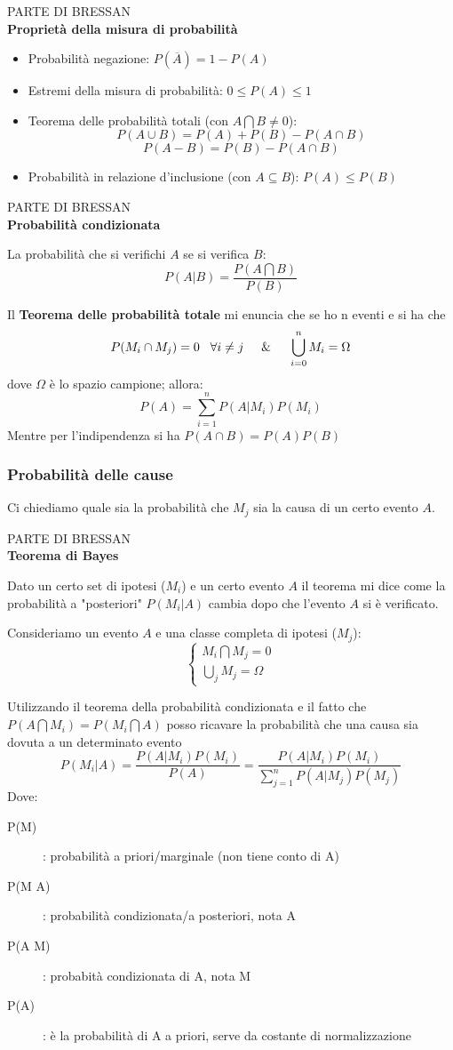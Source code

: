 \documentclass[openany,a4paper,12pt]{book}
\theoremstyle{remark}
\newcommand{\ripasso}[1]{
    \vspace{2em}\noindent %
    \begin{tcolorbox}[
        enhanced,
        boxrule=0pt,                  %
        frame hidden,                 %
        colback=red!5!white,          %
        borderline west={4pt}{0pt}{red!85!black}, %
        sharp corners,                %
        top=8pt, bottom=8pt, left=12pt, %
        width=\textwidth,
        before skip=0pt, after skip=1.5em %
    ]
        {\small\sffamily\color{red!85!black}\MakeUppercase{Parte di Bressan}}\\[4pt]
        {\Large\bfseries\color{black!85} #1}
    \end{tcolorbox}
    \noindent\ignorespaces %
}
\begin{document}
\ripasso{Proprietà della misura di probabilità}
\begin{itemize}

    \item Probabilità negazione: $P(\overline{A})=1-P(A)$
    \item Estremi della misura di probabilità: $0 \leq P(A)\leq 1$
    \item Teorema delle probabilità totali (con $A \bigcap B \neq 0$): 
    \[
    P(A \cup B)=P(A)+P(B)-P(A \cap B)
    \]
    \[
    P(A - B)=P(B)-P(A \cap B)
    \]
    \item Probabilità in relazione d'inclusione (con $A\subseteq B$): $P(A)\leq P(B)$
\end{itemize}


\ripasso{Probabilità condizionata}

La probabilità che si verifichi $A$ se si verifica $B$: 
\[
P(A|B)=\frac{P(A \bigcap B)}{P(B)}
\]

Il \textbf{Teorema delle probabilità totale} mi enuncia che se ho n eventi e si ha che 
\[ \displaystyle P(M_i \cap M_j)=0 \hspace{0.3cm}\forall i \neq j \hspace{0.5cm} \& \hspace{0.5cm} \bigcup_{i=0}^{n}M_i=\Omega \]
dove $\Omega$ è lo spazio campione; allora:
\[
P(A)=\sum_{i=1}^{n}P(A|M_i)P(M_i)
\]
Mentre per l'indipendenza si ha $P(A \cap B)=P(A)P(B)$

\subsubsection*{ Probabilità delle cause}
Ci chiediamo quale sia la probabilità che $M_j$ sia la causa di un certo evento $A$.


\ripasso{ Teorema di Bayes }
Dato un certo set di ipotesi ($M_i$) e un certo evento $A$ il teorema mi dice come la probabilità a "posteriori" $P(M_i|A)$ cambia dopo che l'evento $A$ si è verificato.

Consideriamo un evento $A$ e una classe completa di ipotesi ($M_j$):
\[
\begin{cases}
    M_i\bigcap M_j=0 \\
    \bigcup_j M_j=\Omega
\end{cases}
\]
 
Utilizzando il teorema della probabilità condizionata e il fatto che $P(A \bigcap M_i)=P(M_i \bigcap A)$ posso ricavare la probabilità che una causa sia dovuta a un determinato evento
\[
P(M_i|A)=\frac{P(A|M_i)P(M_i)}{P(A)}=\frac{P(A|M_i)P(M_i)}{\sum_{j=1}^{n}P(A|M_j)P(M_j)}
\]
Dove:
\begin{description}
    \item[P(M)]: probabilità a priori/marginale (non tiene conto di A)
    \item [P(M \textbar \space A)]: probabilità condizionata/a posteriori, nota A
    \item [P(A \textbar \space M)]: probabità condizionata di A, nota M
    \item [P(A)]: è la probabilità di A a priori, serve da costante di normalizzazione
\end{description}
\end{document}
